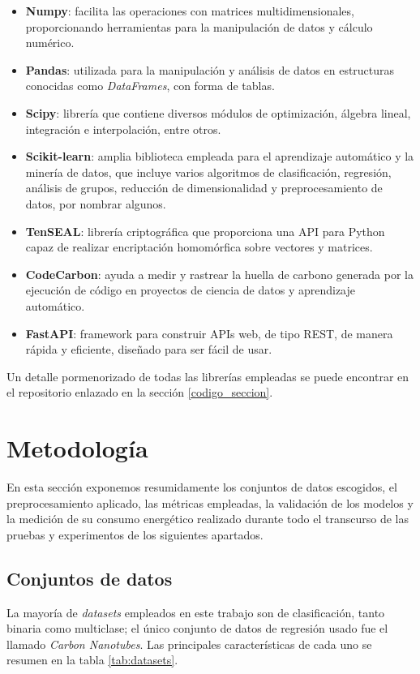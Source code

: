 \documentclass[00-Trabajo_Final.tex]{subfiles}
\begin{document}
\begin{itemize}[noitemsep]
    \item \textbf{Numpy}: facilita las operaciones con matrices multidimensionales, proporcionando herramientas para la manipulación de datos y cálculo numérico.
    \item \textbf{Pandas}: utilizada para la manipulación y análisis de datos en estructuras conocidas como \textit{DataFrames}, con forma de tablas.
    \item \textbf{Scipy}: librería que contiene diversos módulos de optimización, álgebra lineal, integración e interpolación, entre otros.
    \item \textbf{Scikit-learn}: amplia biblioteca empleada para el aprendizaje automático y la minería de datos, que incluye varios algoritmos de clasificación, regresión, análisis de grupos, reducción de dimensionalidad y preprocesamiento de datos, por nombrar algunos.
    \item \textbf{TenSEAL}: librería criptográfica que proporciona una API para Python capaz de realizar encriptación homomórfica sobre vectores y matrices.
    \item \textbf{CodeCarbon}: ayuda a medir y rastrear la huella de carbono generada por la ejecución de código en proyectos de ciencia de datos y aprendizaje automático.
    \item \textbf{FastAPI}: framework para construir APIs web, de tipo REST, de manera rápida y eficiente, diseñado para ser fácil de usar.
\end{itemize}

Un detalle pormenorizado de todas las librerías empleadas se puede encontrar en el repositorio enlazado en la sección \ref{codigo_seccion}.

\newpage

\section{Metodología}
En esta sección exponemos resumidamente los conjuntos de datos escogidos, el preprocesamiento aplicado, las métricas empleadas, la validación de los modelos y la medición de su consumo energético realizado durante todo el transcurso de las pruebas y experimentos de los siguientes apartados.

\subsection*{Conjuntos de datos}
La mayoría de \textit{datasets} empleados en este trabajo son de clasificación, tanto binaria como multiclase; el único conjunto de datos de regresión usado fue el llamado \textit{Carbon Nanotubes}. Las principales características de cada uno se resumen en la tabla \ref{tab:datasets}.
\end{document}

